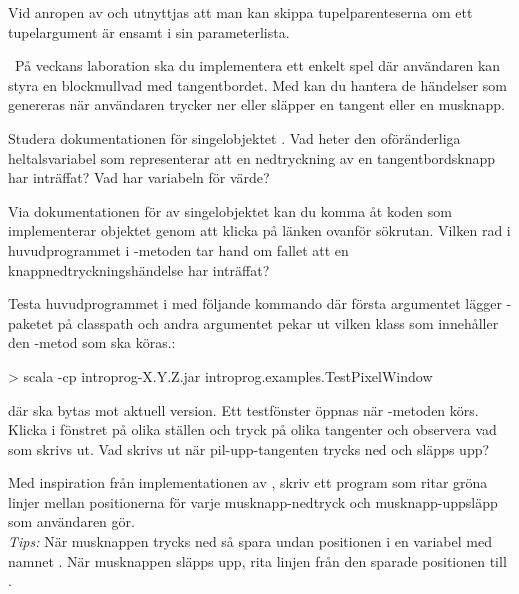 \SubtaskSolved Vid anropen av  och  utnyttjas att man kan skippa tupelparenteserna om ett tupelargument är ensamt i sin parameterlista.



\QUESTEND




\QUESTBEGIN

\Task \what~På veckans laboration ska du implementera ett enkelt spel där användaren kan styra en blockmullvad med tangentbordet. Med  kan du hantera de händelser som genereras när användaren trycker ner eller släpper en tangent eller en musknapp.


\Subtask Studera dokumentationen för singelobjektet . Vad heter den oföränderliga heltalsvariabel som representerar att en nedtryckning av en tangentbordsknapp har inträffat? Vad har variabeln för värde?

\Subtask Via dokumentationen för av singelobjektet  kan du komma åt koden som implementerar objektet genom att klicka på länken  ovanför sökrutan. Vilken rad i huvudprogrammet i -metoden tar hand om fallet att en knappnedtryckningshändelse har inträffat?

\Subtask Testa huvudprogrammet i  med följande kommando där första argumentet lägger -paketet på classpath och andra argumentet pekar ut vilken klass som innehåller den -metod som ska köras.:
\begin{REPLnonum}
> scala -cp introprog-X.Y.Z.jar introprog.examples.TestPixelWindow
\end{REPLnonum}
där  ska bytas mot aktuell version. Ett testfönster öppnas när -metoden körs. Klicka i fönstret på olika ställen och tryck på olika tangenter och observera vad som skrivs ut. Vad skrivs ut när pil-upp-tangenten trycks ned och släpps upp?

\Subtask Med inspiration från implementationen av , skriv ett program som ritar gröna linjer mellan positionerna för varje musknapp-nedtryck och musknapp-uppsläpp som användaren gör. \\\emph{Tips:} När musknappen trycks ned så spara undan positionen i en variabel med namnet . När musknappen släpps upp, rita linjen från den sparade positionen till .

